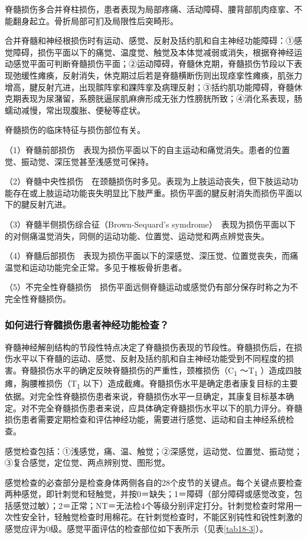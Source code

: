 脊髓损伤多合并脊柱损伤，患者表现为局部疼痛、活动障碍、腰背部肌肉痉挛、不能翻身起立。骨折局部可扪及局限性后突畸形。

合并脊髓和神经根损伤时有运动、感觉、反射及括约肌和自主神经功能障碍：①感觉障碍，损伤平面以下的痛觉、温度觉、触觉及本体觉减弱或消失，根据脊神经运动感觉平面可判断脊髓损伤平面；②运动障碍，脊髓休克期，脊髓损伤节段以下表现弛缓性瘫痪，反射消失，休克期过后若是脊髓横断伤则出现痉挛性瘫痪，肌张力增高，腱反射亢进，出现髌阵挛和踝阵挛及病理反射；③括约肌功能障碍，脊髓休克期表现为尿潴留，系膀胱逼尿肌麻痹形成无张力性膀胱所致；④消化系表现，肠蠕动减慢，常出现腹胀、便秘等症状。

脊髓损伤的临床特征与损伤部位有关。

（1）脊髓前部损伤　表现为损伤平面以下的自主运动和痛觉消失。患者的位置觉、振动觉、深压觉甚至浅感觉可保持。

（2）脊髓中央性损伤　在颈髓损伤时多见。表现为上肢运动丧失，但下肢运动功能存在或上肢运动功能丧失明显比下肢严重。损伤平面的腱反射消失而损伤平面以下的腱反射亢进。

（3）脊髓半侧损伤综合征（Brown-Sequard's
symdrome）　表现为损伤平面以下的对侧痛温觉消失，同侧的运动功能、位置觉、运动觉和两点辨觉丧失。

（4）脊髓后部损伤　表现为损伤平面以下的深感觉、深压觉、位置觉丧失，而痛温觉和运动功能完全正常。多见于椎板骨折患者。

（5）不完全性脊髓损伤　损伤平面远侧脊髓运动或感觉仍有部分保存时称之为不完全性脊髓损伤。

\subsubsection{如何进行脊髓损伤患者神经功能检查？}

脊髓神经解剖结构的节段性特点决定了脊髓损伤表现的节段性。脊髓损伤后，在损伤水平以下脊髓的运动、感觉、反射及括约肌和自主神经功能受到不同程度的损害。脊髓损伤水平的确定反映脊髓损伤的严重性，颈椎损伤（C\textsubscript{1}
～T\textsubscript{1} ）造成四肢瘫，胸腰椎损伤（T\textsubscript{1}
以下）造成截瘫。脊髓损伤水平是确定患者康复目标的主要依据。对完全性脊髓损伤患者来说，脊髓损伤水平一旦确定，其康复目标基本确定。对不完全脊髓损伤患者来说，应具体确定脊髓损伤水平以下的肌力评分。脊髓损伤患者需要定期检查和评估神经功能，需要进行感觉、运动和自主神经系统检查。

感觉检查包括：①浅感觉，痛、温、触觉；②深感觉，运动觉、位置觉、振动觉；③复合感觉，定位觉、两点辨别觉、图形觉。

感觉检查的必查部分是检查身体两侧各自的28个皮节的关键点。每个关键点要检查两种感觉，即针刺觉和轻触觉，并按0＝缺失；1＝障碍（部分障碍或感觉改变，包括感觉过敏）；2＝正常；NT＝无法检4个等级分别评定打分。针刺觉检查时常用一次性安全针，轻触觉检查时用棉花。在针刺觉检查时，不能区别钝性和锐性刺激的感觉应评为0级。感觉平面评估的检查部位如下表所示（见表\ref{tab18-3}）。

